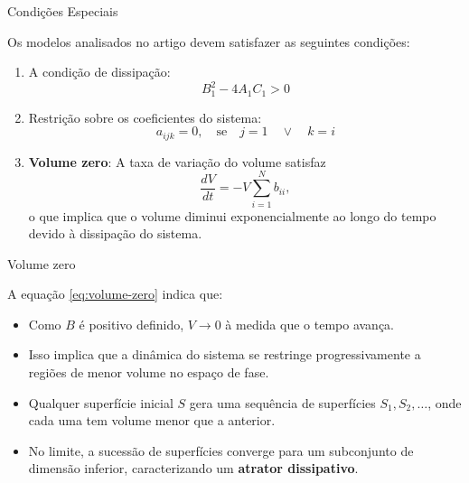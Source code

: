 
\begin{frame}{Condições Especiais}

Os modelos analisados no artigo \cite{lorenz1980} devem satisfazer as seguintes condições:

\begin{enumerate}
    \item A condição de dissipação:
    \begin{equation}
        B_1^2 - 4A_1C_1 > 0 \label{eq:condicao-sis}
    \end{equation}

    \item Restrição sobre os coeficientes do sistema:
    \begin{equation*}
        a_{ijk} = 0, \quad \text{se} \quad j=1 \quad \vee \quad k = i
    \end{equation*}

    \item \textbf{Volume zero}: A taxa de variação do volume satisfaz
    \begin{equation}
        \frac{dV}{dt} = - V \sum_{i=1}^{N} b_{ii}, \label{eq:volume-zero}
    \end{equation}
    o que implica que o volume diminui exponencialmente ao longo do tempo devido à dissipação do sistema.
\end{enumerate}

\end{frame}


\begin{frame}{Volume zero}

A equação \eqref{eq:volume-zero} indica que:
\begin{itemize}
    \item Como $B$ é positivo definido, $V \to 0$ à medida que o tempo avança.
    \item Isso implica que a dinâmica do sistema se restringe progressivamente a regiões de menor volume no espaço de fase.
    \item Qualquer superfície inicial $S$ gera uma sequência de superfícies $S_1, S_2, \dots$, onde cada uma tem volume menor que a anterior.
    \item No limite, a sucessão de superfícies converge para um subconjunto de dimensão inferior, caracterizando um \textbf{atrator dissipativo}.
\end{itemize}

\end{frame}


